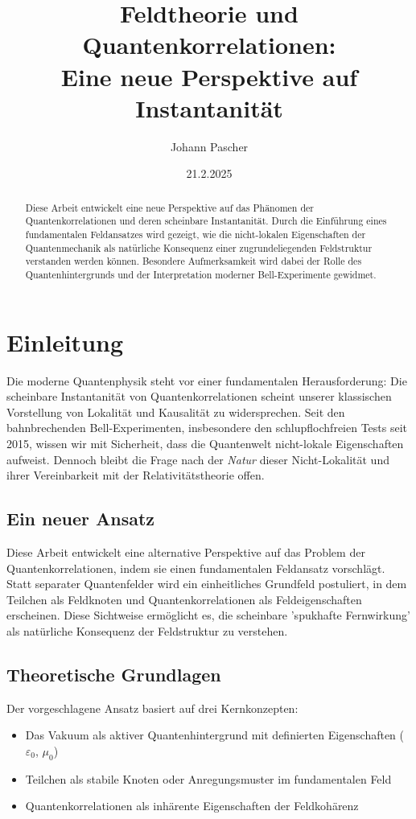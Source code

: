 \documentclass[12pt,a4paper]{article}
\title{Feldtheorie und Quantenkorrelationen: \\ Eine neue Perspektive auf Instantanität}
\author{Johann Pascher}
\date{21.2.2025}
\begin{document}
	\maketitle

\begin{abstract}
	Diese Arbeit entwickelt eine neue Perspektive auf das Phänomen der Quantenkorrelationen und deren scheinbare Instantanität. Durch die Einführung eines fundamentalen Feldansatzes wird gezeigt, wie die nicht-lokalen Eigenschaften der Quantenmechanik als natürliche Konsequenz einer zugrundeliegenden Feldstruktur verstanden werden können. Besondere Aufmerksamkeit wird dabei der Rolle des Quantenhintergrunds und der Interpretation moderner Bell-Experimente gewidmet.
\end{abstract}
    \tableofcontents
\section{Einleitung}

Die moderne Quantenphysik steht vor einer fundamentalen Herausforderung: Die scheinbare Instantanität von Quantenkorrelationen scheint unserer klassischen Vorstellung von Lokalität und Kausalität zu widersprechen. Seit den bahnbrechenden Bell-Experimenten, insbesondere den schlupflochfreien Tests seit 2015, wissen wir mit Sicherheit, dass die Quantenwelt nicht-lokale Eigenschaften aufweist. Dennoch bleibt die Frage nach der \textit{Natur} dieser Nicht-Lokalität und ihrer Vereinbarkeit mit der Relativitätstheorie offen.

\subsection{Ein neuer Ansatz}

Diese Arbeit entwickelt eine alternative Perspektive auf das Problem der Quantenkorrelationen, indem sie einen fundamentalen Feldansatz vorschlägt. Statt separater Quantenfelder wird ein einheitliches Grundfeld postuliert, in dem Teilchen als Feldknoten und Quantenkorrelationen als Feldeigenschaften erscheinen. Diese Sichtweise ermöglicht es, die scheinbare 'spukhafte Fernwirkung' als natürliche Konsequenz der Feldstruktur zu verstehen.

\subsection{Theoretische Grundlagen}

Der vorgeschlagene Ansatz basiert auf drei Kernkonzepten:
\begin{itemize}
	\item Das Vakuum als aktiver Quantenhintergrund mit definierten Eigenschaften ($\varepsilon_0$, $\mu_0$)
	\item Teilchen als stabile Knoten oder Anregungsmuster im fundamentalen Feld
	\item Quantenkorrelationen als inhärente Eigenschaften der Feldkohärenz
\end{itemize}
\end{document}
